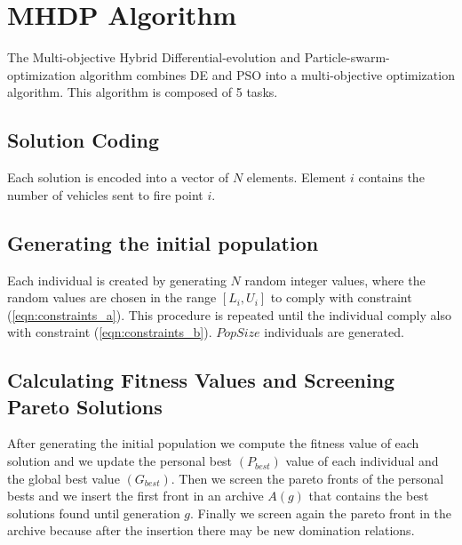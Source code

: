 \section{MHDP Algorithm}
The Multi-objective Hybrid Differential-evolution and Particle-swarm-optimization algorithm combines DE and PSO into a multi-objective optimization algorithm. 
This algorithm is composed of 5 tasks.
\subsection{Solution Coding}
Each solution is encoded into a vector of $N$ elements. Element $i$ contains the number of vehicles sent to fire point $i$.
\subsection{Generating the initial population}
Each individual is created by generating $N$ random integer values, where the random values are chosen in the range \([L_i, U_i]\) to comply with constraint (\ref{eqn:constraints_a}). 
This procedure is repeated until the individual comply also with constraint (\ref{eqn:constraints_b}).
$PopSize$ individuals are generated.
\subsection{Calculating Fitness Values and Screening Pareto Solutions}
After generating the initial population we compute the fitness value of each solution and we update the personal best \((P_{best})\) value of each individual and the global best value \((G_{best})\).
Then we screen the pareto fronts of the personal bests and we insert the first front in an archive \(A(g)\) that contains the best solutions found until generation \(g\).
Finally we screen again the pareto front in the archive because after the insertion there may be new domination relations.
